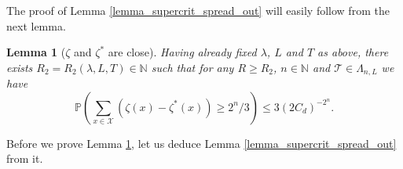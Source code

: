 \documentclass[a4paper,12pt]{article}
\newtheorem  {lemma}         [theorem]{Lemma}
\begin{document}
The proof of Lemma \ref{lemma_supercrit_spread_out} will easily follow from the next lemma.

\begin{lemma}[$\zeta$ and $\zeta^*$ are close]\label{lemma_survival_to_T_suffices}
 Having already fixed $\lambda$, $L$ and $T$ as above, there exists $R_2=R_2(\lambda,L,T) \in \mathbb{N}$ such that for
any $R \geq R_2$, $n \in \mathbb{N}$ and  $\mathcal{T} \in \Lambda_{n,L}$ we have
\begin{equation}\label{survival_to_T_suffices_eq}
 \mathbb{P}\left( \sum_{x \in \mathcal{X} } \left( \zeta(x) - \zeta^{*}(x) \right) \geq  2^n /3 \right) \leq 3 \left( 2 C_d  \right)^{-2^n}.
\end{equation}
\end{lemma}

Before we prove Lemma \ref{lemma_survival_to_T_suffices}, let us deduce Lemma \ref{lemma_supercrit_spread_out} from it.
\end{document}
